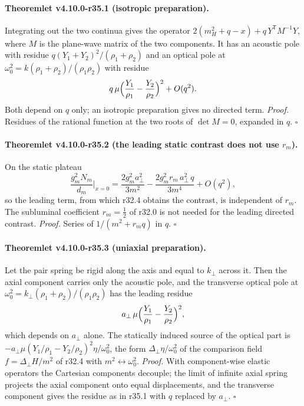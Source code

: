\paragraph{Theoremlet v4.10.0-r35.1 (isotropic preparation).}
Integrating out the two continua gives the operator \(2(m_H^2+q-x)+q\,Y^{\mathsf T}M^{-1}Y\), where \(M\) is the plane-wave matrix of the two components.  It has an
acoustic pole with residue \(q(Y_1+Y_2)^2/(\rho_1+\rho_2)\) and an optical pole at \(\omega_0^2=k(\rho_1+\rho_2)/(\rho_1\rho_2)\) with residue
\[
 q\,\mu\Bigl(\frac{Y_1}{\rho_1}-\frac{Y_2}{\rho_2}\Bigr)^2+O(q^2).
\]
Both depend on \(q\) only; an isotropic preparation gives no directed term.  \emph{Proof.} Residues of the rational function at the two roots of
\(\det M=0\), expanded in \(q\).  \(\square\)

\paragraph{Theoremlet v4.10.0-r35.2 (the leading static contrast does not use \(r_m\)).}
On the static plateau
\[
 \frac{g_m^2N_m}{d_m}\Big|_{x=0}=\frac{2g_m^2a_\perp^2}{3m^2}-\frac{2g_m^2r_m\,a_\perp^2\,q}{3m^4}+O(q^2),
\]
so the leading term, from which r32.4 obtains the contrast, is independent of \(r_m\).  The subluminal coefficient \(r_m=\tfrac12\) of r32.0 is not
needed for the leading directed contrast.  \emph{Proof.} Series of \(1/(m^2+r_mq)\) in \(q\).  \(\square\)

\paragraph{Theoremlet v4.10.0-r35.3 (uniaxial preparation).}
Let the pair spring be rigid along the axis and equal to \(k_\perp\) across it.  Then the axial component carries only the acoustic pole, and the
transverse optical pole at \(\omega_0^2=k_\perp(\rho_1+\rho_2)/(\rho_1\rho_2)\) has the leading residue
\[
 a_\perp\,\mu\Bigl(\frac{Y_1}{\rho_1}-\frac{Y_2}{\rho_2}\Bigr)^2 ,
\]
which depends on \(a_\perp\) alone.  The statically induced source of the optical part is \(-a_\perp\mu(Y_1/\rho_1-Y_2/\rho_2)^2\eta/\omega_0^2\), the form
\(\Delta_\perp\eta/\omega_0^2\) of the comparison field \(f=\Delta_\perp H/m^2\) of r32.4 with \(m^2\leftrightarrow\omega_0^2\).
\emph{Proof.} With component-wise elastic operators the Cartesian components decouple; the limit of infinite axial spring projects the axial
component onto equal displacements, and the transverse component gives the residue as in r35.1 with \(q\) replaced by \(a_\perp\).  \(\square\)

